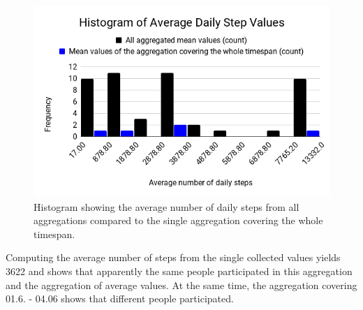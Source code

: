 \begin{figure}[h!]
	\includegraphics[width=\textwidth]{data/diagrams/daily-step-diagram.png}
	\caption{Histogram showing the average number of daily steps from all aggregations compared to the single aggregation covering the whole timespan.}
	\label{steps-diagram}
\end{figure}

Computing the average number of steps from the single collected values yields 3622 and shows that apparently the same people participated in this aggregation and the aggregation of average values. At the same time, the aggregation covering 01.6. - 04.06 shows that different people participated.


